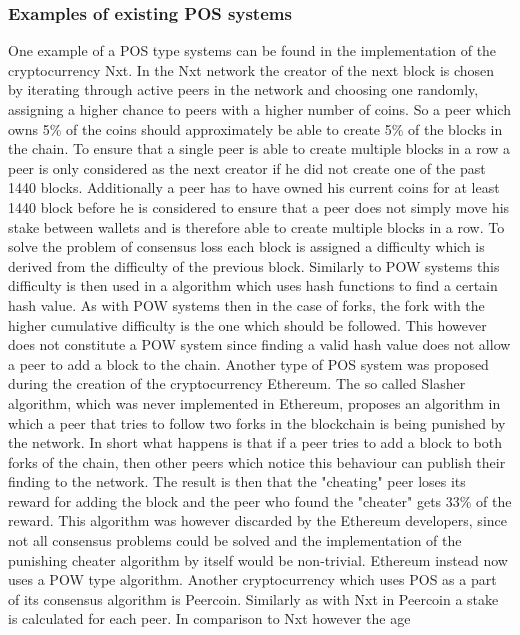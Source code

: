 \subsubsection{Examples of existing POS systems}

One example of a POS type systems can be found in the implementation of the cryptocurrency Nxt. In the Nxt network the creator of the next block is chosen by iterating through active peers in the
network and choosing one randomly, assigning a higher chance to peers with a higher number of coins. So a peer which owns 5\% of the coins should approximately be able to create 5\% of the blocks
in the chain. To ensure that a single peer is able to create multiple blocks in a row a peer is only considered as the next creator if he did not create one of the past 1440 blocks. Additionally
a peer has to have owned his current coins for at least 1440 block before he is considered to ensure that a peer does not simply move his stake between wallets and is therefore able to create
multiple blocks in a row. To solve the problem of consensus loss each block is assigned a difficulty which is derived from the difficulty of the previous block. Similarly to POW systems this
difficulty is then used in a algorithm which uses hash functions to find a certain hash value. As with POW systems then in the case of forks, the fork with the higher cumulative difficulty is
the one which should be followed. This however does not constitute a POW system since finding a valid hash value does not allow a peer to add a block to the chain.\cite{url:nxt}
Another type of POS system was proposed during the creation of the cryptocurrency Ethereum. The so called Slasher algorithm, which was never implemented in Ethereum, proposes an algorithm in
which a peer that tries to follow two forks in the blockchain is being punished by the network. In short what happens is that if a peer tries to add a block to both forks of the chain, then
other peers which notice this behaviour can publish their finding to the network. The result is then that the "cheating" peer loses its reward for adding the block and the peer who found the
"cheater" gets 33\% of the reward.\cite{url:eth_slash} This algorithm was however discarded by the Ethereum developers, since not all consensus problems could be solved and the implementation of the punishing cheater
algorithm by itself would be non-trivial.\cite{url:eth_no_slash} Ethereum instead now uses a POW type algorithm.\cite{url:eth_pow}
Another cryptocurrency which uses POS as a part of its consensus algorithm is Peercoin. Similarly as with Nxt in Peercoin a stake is calculated for each peer. In comparison to Nxt however the age
